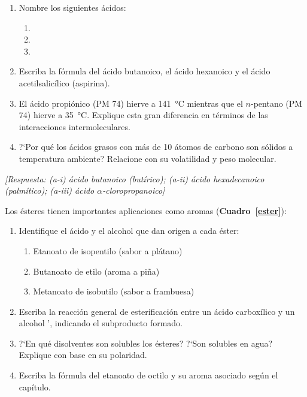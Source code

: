 \begin{bloque_ejercicios}
\begin{ejercicios}
\begin{enumerate}[label=\alph*)]
    \item Nombre los siguientes \'acidos:
          \begin{enumerate}[label=\roman*)]
              \item {}
              \item {}
              \item {}
          \end{enumerate}
    \item Escriba la f\'ormula del \'acido butanoico,
          el \'acido hexanoico y el \'acido acetilsalic\'ilico
          (aspirina).
    \item El \'acido propi\'onico (PM 74) hierve a \SI{141}{\celsius}
          mientras que el $n$-pentano (PM 74) hierve a \SI{35}{\celsius}.
          Explique esta gran diferencia en t\'erminos de las
          interacciones intermoleculares.
    \item ?`Por qu\'e los \'acidos grasos con m\'as de 10 \'atomos
          de carbono son s\'olidos a temperatura ambiente?
          Relacione con su volatilidad y peso molecular.
\end{enumerate}

\textit{[Respuesta: (a-i) \'acido butanoico (but\'irico);
(a-ii) \'acido hexadecanoico (palm\'itico);
(a-iii) \'acido $\alpha$-cloropropanoico]}

\item Los \'esteres tienen importantes aplicaciones como aromas
(\textbf{Cuadro~\ref{ester}}):

\begin{enumerate}[label=\alph*)]
    \item Identifique el \'acido y el alcohol que dan origen
          a cada \'ester:
          \begin{enumerate}[label=\roman*)]
              \item Etanoato de isopentilo (sabor a pl\'atano)
              \item Butanoato de etilo (aroma a pi\~na)
              \item Metanoato de isobutilo (sabor a frambuesa)
          \end{enumerate}
    \item Escriba la reacci\'on general de esterificaci\'on entre un \'acido carbox\'ilico  y un alcohol ',  indicando el subproducto formado.
    \item ?`En qu\'e disolventes son solubles los \'esteres? ?`Son
          solubles en agua? Explique con base en su polaridad.
    \item Escriba la f\'ormula del etanoato de octilo y su
          aroma asociado seg\'un el cap\'itulo.
\end{enumerate}


\end{ejercicios}
\end{bloque_ejercicios}
